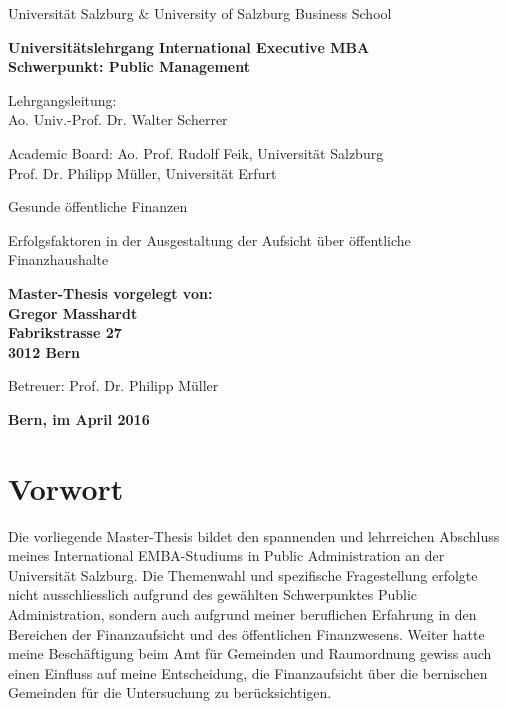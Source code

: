 \documentclass[10pt]{article}
\begin{document}
\begin{titlepage}
\begin{center}
\large
Universität Salzburg \& University of Salzburg Business School

\vspace{1.3cm}
\large
\textbf{Universitätslehrgang International Executive MBA}\\
\textbf{Schwerpunkt: Public Management}

\vspace{1.5cm}
\large
Lehrgangsleitung:\\
Ao. Univ.-Prof. Dr. Walter Scherrer

\vspace{1.5cm}
Academic Board: Ao. Prof. Rudolf Feik, Universität Salzburg\\
Prof. Dr. Philipp Müller, Universität Erfurt

\vspace{1.8cm}
\LARGE
Gesunde öffentliche Finanzen

\large
Erfolgsfaktoren in der Ausgestaltung der Aufsicht über öffentliche Finanzhaushalte

\vspace{3.5cm}
 \end{center}
\begin{flushleft}
\textbf{Master-Thesis vorgelegt von:}\\
\textbf{Gregor Masshardt}\\
\textbf{Fabrikstrasse 27}\\
\textbf{3012 Bern}

\vspace{1.6cm}
Betreuer: Prof. Dr. Philipp Müller

\vspace{1.6cm}
\end{flushleft}
\begin{center}
\textbf{Bern, im April 2016}

 \end{center}
\end{titlepage}
\section*{Vorwort}\label{sec:vorwort}
Die vorliegende Master-Thesis bildet den spannenden und lehrreichen Abschluss meines International EMBA-Studiums in Public Administration an der Universität Salzburg. Die Themenwahl und spezifische Fragestellung erfolgte nicht ausschliesslich aufgrund des gewählten Schwerpunktes Public Administration, sondern auch aufgrund meiner beruflichen Erfahrung in den Bereichen der Finanzaufsicht und des öffentlichen Finanzwesens. Weiter hatte meine Beschäftigung beim Amt für Gemeinden und Raumordnung gewiss auch einen Einfluss auf meine Entscheidung, die Finanzaufsicht über die bernischen Gemeinden für die Untersuchung zu berücksichtigen.
\end{document}
